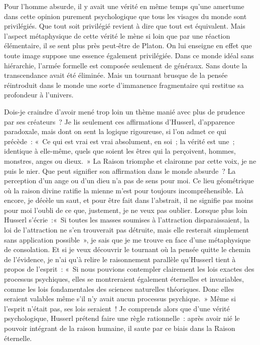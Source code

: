 \documentclass{book}
\begin{document}
Pour l'homme absurde, il y avait une vérité en même temps qu'une amertume dans cette opinion purement psychologique que tous les visages du monde sont privilégiés. Que tout soit privilégié revient à dire que tout est équivalent. Mais l'aspect métaphysique de cette vérité le mène si loin que par une réaction élémentaire, il se sent plus près peut‑être de Platon. On lui enseigne en effet que toute image suppose une essence également privilégiée. Dans ce monde idéal sans hiérarchie, l'armée formelle est composée seulement de généraux. Sans doute la transcendance avait été éliminée. Mais un tournant brusque de la pensée réintroduit dans le monde une sorte d'immanence fragmentaire qui restitue sa profondeur à l'univers.

Dois-je craindre d'avoir mené trop loin un thème manié avec plus de prudence par ses créateurs ? Je lis seulement ces affirmations d'Husserl, d'apparence paradoxale, mais dont on sent la logique rigoureuse, si l'on admet ce qui précède : « Ce qui est vrai est vrai absolument, en soi ; la vérité est une ; identique à elle‑même, quels que soient les êtres qui la perçoivent, hommes, monstres, anges ou dieux. » La Raison triomphe et claironne par cette voix, je ne puis le nier. Que peut signifier son affirmation dans le monde absurde ? La perception d'un ange ou d'un dieu n'a pas de sens pour moi. Ce lieu géométrique où la raison divine ratifie la mienne m'est pour toujours incompréhen­sible. Là encore, je décèle un saut, et pour être fait dans l'abstrait, il ne signifie pas moins pour moi l'oubli de ce que, justement, je ne veux pas oublier. Lorsque plus loin Husserl s'écrie :« Si toutes les masses soumises à l'attraction disparaissaient, la loi de l'attraction ne s'en trouverait pas détruite, mais elle resterait simplement sans application possible », je sais que je me trouve en face d'une métaphysique de consolation. Et si je veux découvrir le tournant où la pensée quitte le chemin de l'évidence, je n'ai qu'à relire le raisonnement parallèle qu'Husserl tient à propos de l'esprit : « Si nous pouvions con­templer clairement les lois exactes des processus psychiques, elles se montreraient également éternelles et invariables, comme les lois fonda­mentales des sciences naturelles théoriques. Donc elles seraient valables même s'il n'y avait aucun processus psychique. » Même si l'esprit n'était pas, ses lois seraient ! Je comprends alors que d'une vérité psychologique, Husserl prétend faire une règle rationnelle : après avoir nié le pouvoir intégrant de la raison humaine, il saute par ce biais dans la Raison éternelle.
\end{document}
